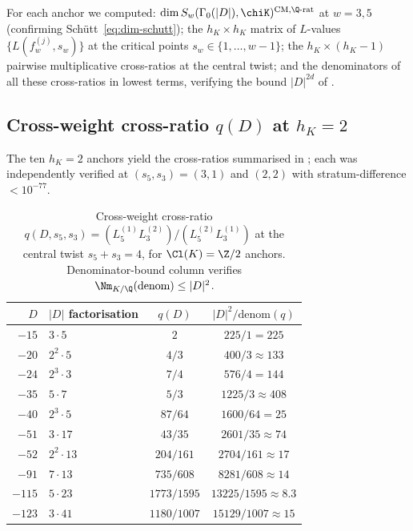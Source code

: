 For each anchor we computed: $\dim S_w(\Gamma_0(|D|),
\chiK)^{\mathrm{CM},\Q\text{-rat}}$ at $w = 3, 5$ (confirming
Sch\"utt~\eqref{eq:dim-schutt}); the $h_K \times h_K$ matrix of
$L$-values $\{L(f_w^{(j)}, s_w)\}$ at the critical points
$s_w \in \{1, \dots, w-1\}$; the $h_K \times (h_K - 1)$ pairwise
multiplicative cross-ratios at the central twist; and the
denominators of all these cross-ratios in lowest terms,
verifying the bound $|D|^{2d}$ of .

\subsection{Cross-weight cross-ratio $q(D)$ at $h_K = 2$}
\label{ss:q-table-empirical}

The ten $h_K = 2$ anchors yield the cross-ratios summarised in
; each was independently verified at $(s_5,
s_3) = (3,1)$ and $(2,2)$ with stratum-difference $< 10^{-77}$.

\begin{table}[h!]
\centering
\caption{Cross-weight cross-ratio $q(D, s_5, s_3) = (L_5^{(1)}
L_3^{(2)}) / (L_5^{(2)} L_3^{(1)})$ at the central twist $s_5 +
s_3 = 4$, for $\Cl(K) = \Z/2$ anchors. Denominator-bound column
verifies $\Nm_{K/\Q}(\text{denom}) \leq |D|^2$.}
\label{tab:q-h2-full}
\begin{tabular}{rlcc}
\toprule
$D$ & $|D|$ factorisation & $q(D)$ & $|D|^2 / \mathrm{denom}(q)$ \\
\midrule
$-15$  & $3 \cdot 5$        & $2$         & $225/1 = 225$ \\
$-20$  & $2^2 \cdot 5$      & $4/3$       & $400/3 \approx 133$ \\
$-24$  & $2^3 \cdot 3$      & $7/4$       & $576/4 = 144$ \\
$-35$  & $5 \cdot 7$        & $5/3$       & $1225/3 \approx 408$ \\
$-40$  & $2^3 \cdot 5$      & $87/64$     & $1600/64 = 25$ \\
$-51$  & $3 \cdot 17$       & $43/35$     & $2601/35 \approx 74$ \\
$-52$  & $2^2 \cdot 13$     & $204/161$   & $2704/161 \approx 17$ \\
$-91$  & $7 \cdot 13$       & $735/608$   & $8281/608 \approx 14$ \\
$-115$ & $5 \cdot 23$       & $1773/1595$ & $13225/1595 \approx 8.3$ \\
$-123$ & $3 \cdot 41$       & $1180/1007$ & $15129/1007 \approx 15$ \\
\bottomrule
\end{tabular}
\end{table}


